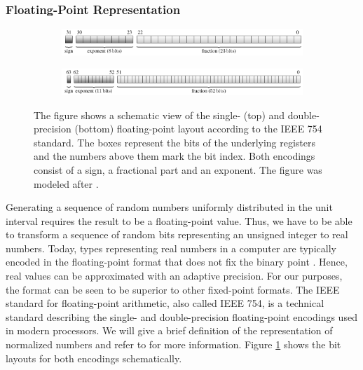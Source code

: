 \documentclass{stdlocal}
\begin{document}
  \subsubsection*{Floating-Point Representation} %
  \label{sub:floating_point_representation}
    \begin{figure}
      \center
      \begin{subfigure}[b]{\textwidth}
        \center
        \includegraphics[width=\textwidth]{figures/floating-point_encoding_single.pdf}
      \end{subfigure}

      \begin{subfigure}[b]{\textwidth}
        \center
        \includegraphics[width=\textwidth]{figures/floating-point_encoding_double.pdf}
      \end{subfigure}
      \caption[Single- and Double-Precision Floating-Point Layout]{%
        The figure shows a schematic view of the single- (top) and double-precision (bottom) floating-point layout according to the IEEE 754 standard.
        The boxes represent the bits of the underlying registers and the numbers above them mark the bit index.
        Both encodings consist of a sign, a fractional part and an exponent.
        The figure was modeled after \textcite[\ppno~197-198]{patterson2014}.
      }
      \label{fig:floating-point-encoding}
    \end{figure}
    Generating a sequence of random numbers uniformly distributed in the unit interval requires the result to be a floating-point value.
    Thus, we have to be able to transform a sequence of random bits representing an unsigned integer to real numbers.
    Today, types representing real numbers in a computer are typically encoded in the floating-point format that does not fix the binary point \autocite{patterson2014}.
    Hence, real values can be approximated with an adaptive precision.
    For our purposes, the format can be seen to be superior to other fixed-point formats.
    The IEEE standard for floating-point arithmetic, also called IEEE 754, is a technical standard describing the single- and double-precision floating-point encodings used in modern processors.
    We will give a brief definition of the representation of normalized numbers and refer to \textcite[\ppno~196-220]{patterson2014} for more information.
    Figure \ref{fig:floating-point-encoding} shows the bit layouts for both encodings schematically.
\end{document}
